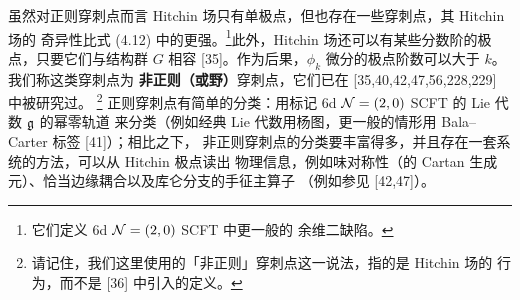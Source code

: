 虽然对正则穿刺点而言 Hitchin 场只有单极点，但也存在一些穿刺点，其 Hitchin 场的
奇异性比式 (4.12) 中的更强。\footnote{它们定义 6d $\mathcal{N}=(2,0)$ SCFT 中更一般的
余维二缺陷。}此外，Hitchin 场还可以有某些分数阶的极点，只要它们与结构群 $G$
相容 [35]。作为后果，$\phi_k$ 微分的极点阶数可以大于 $k$。我们称这类穿刺点为
\textbf{非正则（或野）}穿刺点，它们已在 [35,40,42,47,56,228,229] 中被研究过。
\footnote{请记住，我们这里使用的「非正则」穿刺点这一说法，指的是 Hitchin 场的
行为，而不是 [36] 中引入的定义。}
正则穿刺点有简单的分类：用标记 6d $\mathcal{N}=(2,0)$ SCFT 的 Lie 代数 $\mathfrak{g}$ 的幂零轨道
来分类（例如经典 Lie 代数用杨图，更一般的情形用 Bala--Carter 标签 [41]）；相比之下，
非正则穿刺点的分类要丰富得多，并且存在一套系统的方法，可以从 Hitchin 极点读出
物理信息，例如味对称性（的 Cartan 生成元）、恰当边缘耦合以及库仑分支的手征主算子
（例如参见 [42,47]）。



